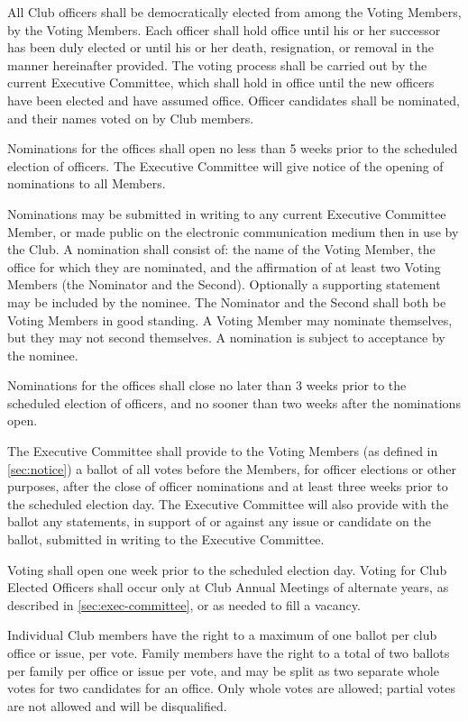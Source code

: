 \documentclass{bylaws}
\begin{document}
All Club officers shall be democratically elected from among the Voting Members, by the Voting Members. Each officer shall hold office until his or her successor has been duly elected or until his or her death, resignation, or removal in the manner hereinafter provided. The voting process shall be carried out by the current Executive Committee, which shall hold in office until the new officers have been elected and have assumed office. Officer candidates shall be nominated, and their names voted on by Club members. 

Nominations for the offices shall open no less than 5 weeks prior to the scheduled election of officers.  The Executive Committee will give notice of the opening of nominations to all Members.

Nominations may be submitted in writing to any current Executive Committee Member, or made public on the electronic communication medium then in use by the Club. A nomination shall consist of: the name of the Voting Member, the office for which they are nominated, and the affirmation of at least two Voting Members (the Nominator and the Second). Optionally a supporting statement may be included by the nominee. The Nominator and the Second shall both be Voting Members in good standing. A Voting Member may nominate themselves, but they may not second themselves. A nomination is subject to acceptance by the nominee.

Nominations for the offices shall close no later than 3 weeks prior to the scheduled election of officers, and no sooner than two weeks after the nominations open.

The Executive Committee shall provide to the Voting Members (as defined in \ref{sec:notice}) a ballot of all votes before the Members, for officer elections or other purposes, after the close of officer nominations and at least three weeks prior to the scheduled election day.  The Executive Committee will also provide with the ballot any statements, in support of or against any issue or candidate on the ballot, submitted in writing to the Executive Committee.

Voting shall open one week prior to the scheduled election day. Voting for Club Elected Officers shall occur only at Club Annual Meetings of alternate years, as described in \ref{sec:exec-committee}, or as needed to fill a vacancy.

Individual Club members have the right to a maximum of one ballot per club office or issue, per vote. Family members have the right to a total of two ballots per family per office or issue per vote, and may be split as two separate whole votes for two candidates for an office. Only whole votes are allowed; partial votes are not allowed and will be disqualified. 
\end{document}
